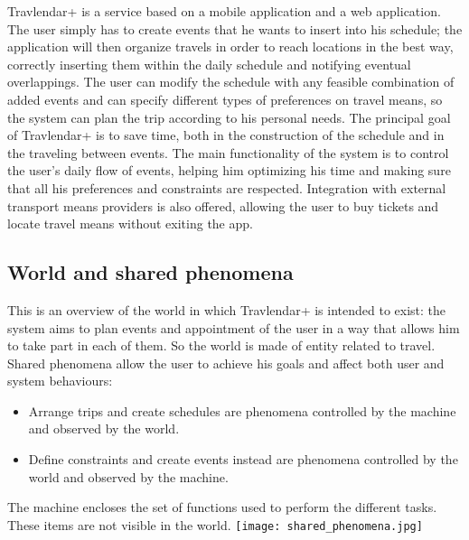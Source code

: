 Travlendar+ is a service based on a mobile application and a web application.
\newline
\newline
The user simply has to create events that he wants to insert into his schedule; the application will then organize travels in order to reach locations in the best way, correctly inserting them within the daily schedule and notifying eventual overlappings. \newline
The user can modify the schedule with any feasible combination of added events and can specify different types of preferences on travel means, so the system can plan the trip according to his personal needs.
\newline
\newline
The principal goal of Travlendar+ is to save time, both in the construction of the schedule and in the traveling between events.
The main functionality of the system is to control the user's daily flow of events, helping him optimizing his time and making sure that all his preferences and constraints are respected.
Integration with external transport means providers is also offered, allowing the user to buy tickets and locate travel means without exiting the app.
\newline

\subsection{World and shared phenomena}
This is an overview of the world in which Travlendar+ is intended to exist: the system aims to plan events and appointment of the user in a way that allows him to take part in each of them. So the world is made of entity related to travel. 
\newline
\newline
Shared phenomena allow the user to achieve his goals and affect both user and system behaviours:
\begin{itemize}
	\item Arrange trips and create schedules are phenomena controlled by the machine and observed by the world. 
	\item Define constraints and create events instead are phenomena controlled by the world and observed by the machine.
\end{itemize}
The machine encloses the set of functions used to perform the different tasks. These items are not visible in the world.
\newline
\newline
\texttt{[image: shared\_phenomena.jpg]}
